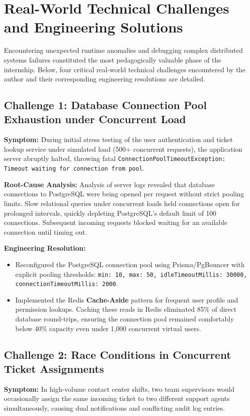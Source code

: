 \section{Real-World Technical Challenges and Engineering Solutions}
\label{sec:exp_challenges}

Encountering unexpected runtime anomalies and debugging complex distributed systems failures constituted the most pedagogically valuable phase of the internship. Below, four critical real-world technical challenges encountered by the author and their corresponding engineering resolutions are detailed.

\subsection{Challenge 1: Database Connection Pool Exhaustion under Concurrent Load}
\textbf{Symptom:} During initial stress testing of the user authentication and ticket lookup service under simulated load (500+ concurrent requests), the application server abruptly halted, throwing fatal \texttt{ConnectionPoolTimeoutException: Timeout waiting for connection from pool}.

\textbf{Root-Cause Analysis:} Analysis of server logs revealed that database connections to PostgreSQL were being opened per request without strict pooling limits. Slow relational queries under concurrent loads held connections open for prolonged intervals, quickly depleting PostgreSQL's default limit of 100 connections. Subsequent incoming requests blocked waiting for an available connection until timing out.

\textbf{Engineering Resolution:}
\begin{itemize}
    \item Reconfigured the PostgreSQL connection pool using Prisma/PgBouncer with explicit pooling thresholds: \texttt{min: 10, max: 50, idleTimeoutMillis: 30000, connectionTimeoutMillis: 2000}.
    \item Implemented the Redis \textbf{Cache-Aside} pattern for frequent user profile and permission lookups. Caching these reads in Redis eliminated 85\% of direct database round-trips, ensuring the connection pool remained comfortably below 40\% capacity even under 1,000 concurrent virtual users.
\end{itemize}

\subsection{Challenge 2: Race Conditions in Concurrent Ticket Assignments}
\textbf{Symptom:} In high-volume contact center shifts, two team supervisors would occasionally assign the same incoming ticket to two different support agents simultaneously, causing dual notifications and conflicting audit log entries.


